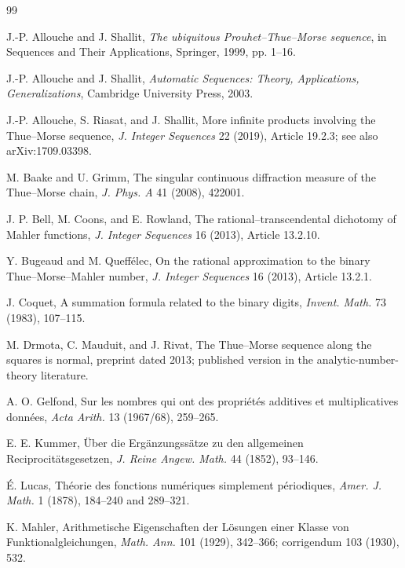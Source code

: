 \documentclass[11pt,oneside]{article}
\numberwithin{equation}{section}
\theoremstyle{definition}
\theoremstyle{remark}
\begin{document}
\begin{thebibliography}{99}

J.-P. Allouche and J. Shallit,
\emph{The ubiquitous Prouhet--Thue--Morse sequence},
in Sequences and Their Applications, Springer, 1999, pp. 1--16.

J.-P. Allouche and J. Shallit,
\emph{Automatic Sequences: Theory, Applications, Generalizations},
Cambridge University Press, 2003.

J.-P. Allouche, S. Riasat, and J. Shallit,
More infinite products involving the Thue--Morse sequence,
\emph{J. Integer Sequences} 22 (2019), Article 19.2.3;
see also arXiv:1709.03398.

M. Baake and U. Grimm,
The singular continuous diffraction measure of the Thue--Morse chain,
\emph{J. Phys. A} 41 (2008), 422001.

J. P. Bell, M. Coons, and E. Rowland,
The rational--transcendental dichotomy of Mahler functions,
\emph{J. Integer Sequences} 16 (2013), Article 13.2.10.

Y. Bugeaud and M. Queff\'elec,
On the rational approximation to the binary Thue--Morse--Mahler number,
\emph{J. Integer Sequences} 16 (2013), Article 13.2.1.

J. Coquet,
A summation formula related to the binary digits,
\emph{Invent. Math.} 73 (1983), 107--115.

M. Drmota, C. Mauduit, and J. Rivat,
The Thue--Morse sequence along the squares is normal,
preprint dated 2013; published version in the analytic-number-theory
literature.

A. O. Gelfond,
Sur les nombres qui ont des propri\'et\'es additives et multiplicatives
donn\'ees,
\emph{Acta Arith.} 13 (1967/68), 259--265.

E. E. Kummer,
\"Uber die Erg\"anzungss\"atze zu den allgemeinen Reciprocit\"atsgesetzen,
\emph{J. Reine Angew. Math.} 44 (1852), 93--146.

\'E. Lucas,
Th\'eorie des fonctions num\'eriques simplement p\'eriodiques,
\emph{Amer. J. Math.} 1 (1878), 184--240 and 289--321.

K. Mahler,
Arithmetische Eigenschaften der L\"osungen einer Klasse von
Funktionalgleichungen,
\emph{Math. Ann.} 101 (1929), 342--366; corrigendum 103 (1930), 532.


\end{thebibliography}
\end{document}
